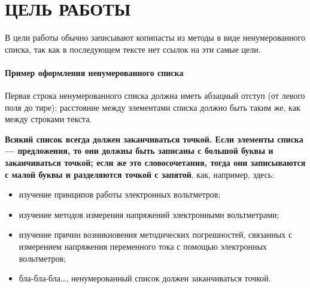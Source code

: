 \section{ЦЕЛЬ РАБОТЫ}

В цели работы обычно записывают копипасты из методы в виде ненумерованного списка,
так как в последующем тексте нет ссылок на эти самые цели.

\paragraph{Пример оформления ненумерованного списка}
Первая строка ненумерованного списка должна иметь абзацный отступ (от левого поля до тире); 
расстояние между элементами списка должно быть таким же, как между строками текста.

\textbf{Всякий список всегда должен заканчиваться точкой. Если элементы списка --- 
предложения, то они должны быть записаны с большой буквы и заканчиваться точкой; если же это 
словосочетания, тогда они записываются с малой буквы и разделяются точкой с запятой}, как, например, здесь: 

\begin{itemize} 
\item изучение принципов работы электронных вольтметров;
\item изучение методов измерения напряжений электронными вольтметрами;
\item изучение причин возникновения методических погрешностей, связанных с измерением напряжения переменного тока с помощью электронных вольтметров;
\item бла-бла-бла\dots, ненумерованный список должен заканчиваться точкой.
\end{itemize}

\newpage